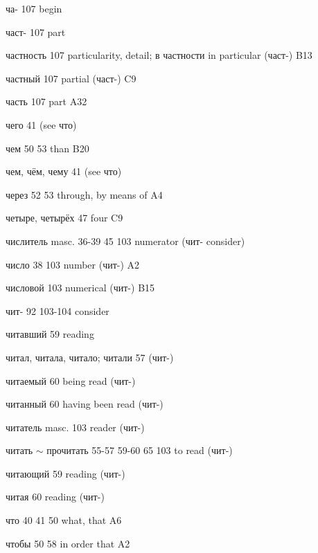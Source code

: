 \begin{minipage}[t]{0.475\textwidth}
\raggedright
\noindent ча- 107 begin\par
\noindent част- 107 part\par
\noindent частность 107 particularity, detail; в частности in particular (част-) B13\par
\noindent частный 107 partial (част-) C9\par
\noindent часть 107 part A32\par
\noindent чего 41 (see что)\par
\noindent чем 50 53 than B20\par
\noindent чем, чём, чему 41 (see что)\par
\noindent через 52 53 through, by means of A4\par
\noindent четыре, четырёх 47 four C9\par
\noindent числитель masc. 36-39 45 103 numerator (чит- consider)\par
\noindent число 38 103 number (чит-) A2\par
\noindent числовой 103 numerical (чит-) B15\par
\noindent чит- 92 103-104 consider\par
\noindent читавший 59 reading\par
\noindent читал, читала, читало; читали 57 (чит-)\par
\noindent читаемый 60 being read (чит-)\par
\noindent читанный 60 having been read (чит-)\par
\noindent читатель masc. 103 reader (чит-)\par
\noindent читать $\sim$ прочитать 55-57 59-60 65 103 to read (чит-)\par
\noindent читающий 59 reading (чит-)\par
\noindent читая 60 reading (чит-)\par
\noindent что 40 41 50 what, that A6\par
\noindent чтобы 50 58 in order that A2\par
\end{minipage}\hfill
